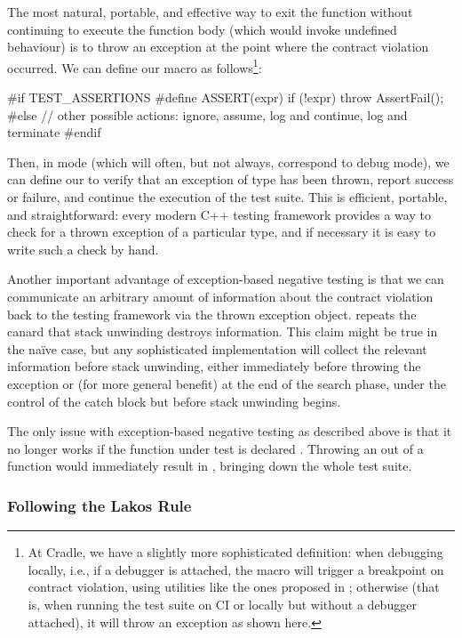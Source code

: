 The most natural, portable, and effective way to exit the function without continuing to execute the function body (which would invoke undefined behaviour) is to throw an exception at the point where the contract violation occurred. We can define our  macro as follows\footnote{At Cradle, we have a slightly more sophisticated definition: when debugging locally, i.e., if a debugger is attached, the  macro will trigger a breakpoint on contract violation, using utilities like the ones proposed in \cite{P2514R0}; otherwise (that is, when running the test suite on CI or locally but without a debugger attached), it will throw an  exception as shown here.}:
\begin{codeblock}
#if TEST_ASSERTIONS
  #define ASSERT(expr) if (!expr) throw AssertFail();
#else
  // other possible actions: ignore, assume, log and continue, log and terminate
#endif
\end{codeblock}
Then, in  mode (which will often, but not always, correspond to debug mode), we can define our  to verify that an exception of type  has been thrown, report success or failure, and continue the execution of the test suite. This is efficient, portable, and straightforward: every modern C++ testing framework provides a way to check for a thrown exception of a particular type, and if necessary it is easy to write such a check by hand.

Another important advantage of exception-based negative testing is that we can communicate an arbitrary amount of information about the contract violation back to the testing framework via the thrown exception object. \cite{P1656R2} repeats the canard that stack unwinding destroys information. This claim might be true in the na\" ive case, but any sophisticated implementation will collect the relevant information before stack unwinding, either immediately before throwing the exception or (for more general benefit) at the end of the search phase, under the control of the catch block but before stack unwinding begins.

The only issue with exception-based negative testing as described above is that it no longer works if the function under test is declared . Throwing an  out of a  function would immediately result in , bringing down the whole test suite. 

\subsubsection{Following the Lakos Rule}

